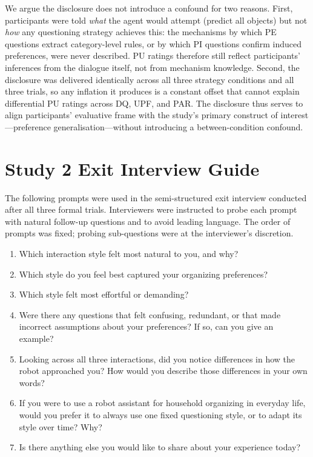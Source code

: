 \documentclass[manuscript,review,anonymous]{acmart}
\begin{document}
We argue the disclosure does not introduce a confound for two reasons. First, participants were told \textit{what} the agent would attempt (predict all objects) but not \textit{how} any questioning strategy achieves this: the mechanisms by which PE questions extract category-level rules, or by which PI questions confirm induced preferences, were never described. PU ratings therefore still reflect participants' inferences from the dialogue itself, not from mechanism knowledge. Second, the disclosure was delivered identically across all three strategy conditions and all three trials, so any inflation it produces is a constant offset that cannot explain differential PU ratings across DQ, UPF, and PAR. The disclosure thus serves to align participants' evaluative frame with the study's primary construct of interest---preference generalisation---without introducing a between-condition confound.

\section{Study 2 Exit Interview Guide}
\label{app:interview-guide}

The following prompts were used in the semi-structured exit interview conducted after all three formal trials. Interviewers were instructed to probe each prompt with natural follow-up questions and to avoid leading language. The order of prompts was fixed; probing sub-questions were at the interviewer's discretion.

\begin{enumerate}[leftmargin=*, label=\textbf{Q\arabic*.}]
  \item Which interaction style felt most natural to you, and why?
  \item Which style do you feel best captured your organizing preferences?
  \item Which style felt most effortful or demanding?
  \item Were there any questions that felt confusing, redundant, or that made incorrect assumptions about your preferences? If so, can you give an example?
  \item Looking across all three interactions, did you notice differences in how the robot approached you? How would you describe those differences in your own words?
  \item If you were to use a robot assistant for household organizing in everyday life, would you prefer it to always use one fixed questioning style, or to adapt its style over time? Why?
  \item Is there anything else you would like to share about your experience today?
\end{enumerate}

\end{document}
